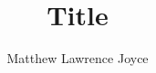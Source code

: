 \documentclass[11pt,modernstyle]{thesis}
\title{Title}
\author{Matthew Lawrence Joyce}
\begin{document}
	\maketitle
	
	\tableofcontents
	\listoffigures
	\listoftables
	\begin{linenumbers}	
	
	
	
	
	
%	
%	
	\end{linenumbers}
	
	
\end{document}
